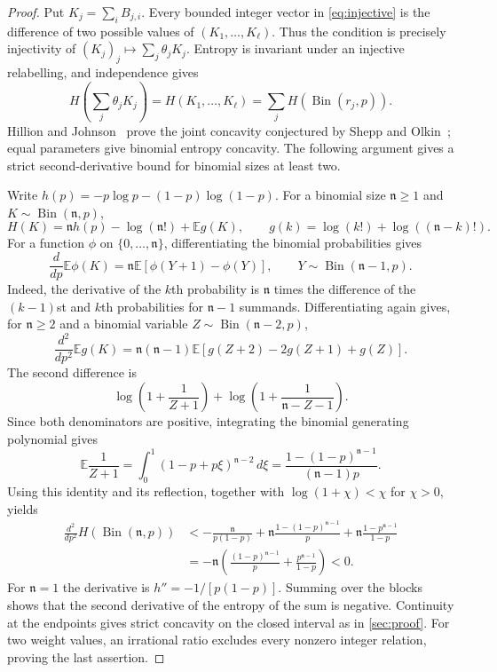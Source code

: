 \documentclass[11pt,a4paper]{article}
\numberwithin{equation}{section}
\theoremstyle{remark}
\begin{document}
\begin{proof}
Put $K_j=\sum_iB_{j,i}$. Every bounded integer vector in \eqref{eq:injective} is the difference of two possible values of $(K_1,\ldots,K_\ell)$. Thus the condition is precisely injectivity of $(K_j)_j\mapsto\sum_j\theta_jK_j$. Entropy is invariant under an injective relabelling, and independence gives
\[
 H\!\left(\sum_j\theta_jK_j\right)
 =H(K_1,\ldots,K_\ell)
 =\sum_jH(\operatorname{Bin}(r_j,p)).
\]
Hillion and Johnson~\cite{HJ} prove the joint concavity conjectured by Shepp and Olkin~\cite{SO}; equal parameters give binomial entropy concavity. The following argument gives a strict second-derivative bound for binomial sizes at least two.

Write $h(p)=-p\log p-(1-p)\log(1-p)$. For a binomial size $\mathfrak n\ge1$ and $K\sim\operatorname{Bin}(\mathfrak n,p)$,
\[
 H(K)=\mathfrak n h(p)-\log(\mathfrak n!)+\mathbb E g(K),
 \qquad g(k)=\log(k!)+\log((\mathfrak n-k)!).
\]
For a function $\phi$ on $\{0,\ldots,\mathfrak n\}$, differentiating the binomial probabilities gives
\[
 \frac{d}{dp}\mathbb E \phi(K)
 =\mathfrak n\mathbb E[\phi(Y+1)-\phi(Y)],\qquad
 Y\sim\operatorname{Bin}(\mathfrak n-1,p).
\]
Indeed, the derivative of the $k$th probability is $\mathfrak n$ times the difference of the $(k-1)$st and $k$th probabilities for $\mathfrak n-1$ summands. Differentiating again gives, for $\mathfrak n\ge2$ and a binomial variable $Z\sim\operatorname{Bin}(\mathfrak n-2,p)$,
\[
 \frac{d^2}{dp^2}\mathbb E g(K)
 =\mathfrak n(\mathfrak n-1)\mathbb E[ g(Z+2)-2g(Z+1)+g(Z)].
\]
The second difference is
\[
 \log\!\left(1+\frac1{Z+1}\right)
 +\log\!\left(1+\frac1{\mathfrak n-Z-1}\right).
\]
Since both denominators are positive, integrating the binomial generating polynomial gives
\[
 \mathbb E\frac1{Z+1}
 =\int_0^1(1-p+p\xi)^{\mathfrak n-2}\,d\xi
 =\frac{1-(1-p)^{\mathfrak n-1}}{(\mathfrak n-1)p}.
\]
Using this identity and its reflection, together with $\log(1+\chi)<\chi$ for $\chi>0$, yields
\begin{align*}
 \frac{d^2}{dp^2}H(\operatorname{Bin}(\mathfrak n,p))
 &<-\frac{\mathfrak n}{p(1-p)}
   +\mathfrak n\frac{1-(1-p)^{\mathfrak n-1}}p
   +\mathfrak n\frac{1-p^{\mathfrak n-1}}{1-p}\\
 &=-\mathfrak n\left(\frac{(1-p)^{\mathfrak n-1}}p+\frac{p^{\mathfrak n-1}}{1-p}\right)<0.
\end{align*}
For $\mathfrak n=1$ the derivative is $h''=-1/[p(1-p)]$. Summing over the blocks shows that the second derivative of the entropy of the sum is negative. Continuity at the endpoints gives strict concavity on the closed interval as in \cref{sec:proof}. For two weight values, an irrational ratio excludes every nonzero integer relation, proving the last assertion.
\end{proof}
\end{document}
